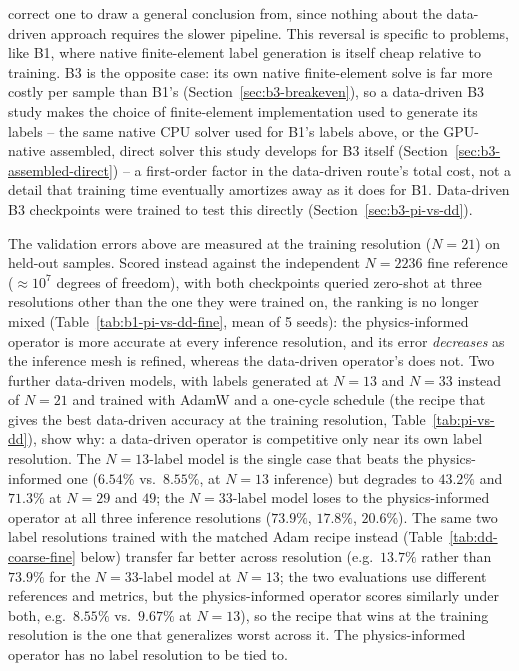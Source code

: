 \documentclass[final,5p,times]{elsarticle}
\begin{document}
correct one to draw a general conclusion from, since nothing about the
data-driven approach requires the slower pipeline. This reversal is specific to problems, like B1, where native
finite-element label generation is itself cheap relative to training.
B3 is the opposite case: its own native finite-element solve is far more
costly per sample than B1's (Section~\ref{sec:b3-breakeven}), so a
data-driven B3 study makes the choice of finite-element
implementation used to generate its labels -- the same native CPU solver
used for B1's labels above, or the GPU-native assembled, direct solver
this study develops for B3 itself (Section~\ref{sec:b3-assembled-direct})
-- a first-order factor in the data-driven route's total cost, not a
detail that training time eventually amortizes away as it does for B1.
Data-driven B3 checkpoints were trained to test this directly
(Section~\ref{sec:b3-pi-vs-dd}).

The validation errors above are measured at the training resolution
($N{=}21$) on held-out samples. Scored instead against the independent
$N{=}2236$ fine reference ($\approx10^7$ degrees of freedom), with both
checkpoints queried zero-shot at three resolutions other than the one
they were trained on, the ranking is no longer mixed
(Table~\ref{tab:b1-pi-vs-dd-fine}, mean of 5 seeds): the physics-informed
operator is more accurate at every inference resolution, and its error
\emph{decreases} as the inference mesh is refined, whereas the
data-driven operator's does not. Two further data-driven models, with
labels generated at $N{=}13$ and $N{=}33$ instead of $N{=}21$ and trained
with AdamW and a one-cycle schedule (the recipe that gives the best
data-driven accuracy at the training resolution,
Table~\ref{tab:pi-vs-dd}), show why: a data-driven operator is
competitive only near its own label resolution. The $N{=}13$-label model is the
single case that beats the physics-informed one ($6.54\%$ vs.\
$8.55\%$, at $N{=}13$ inference) but degrades to $43.2\%$ and $71.3\%$
at $N{=}29$ and $49$; the $N{=}33$-label model loses to the
physics-informed operator at all three inference resolutions ($73.9\%$,
$17.8\%$, $20.6\%$). The same two label resolutions trained with the
matched Adam recipe instead (Table~\ref{tab:dd-coarse-fine} below)
transfer far better across resolution (e.g.\ $13.7\%$ rather than
$73.9\%$ for the $N{=}33$-label model at $N{=}13$; the two evaluations
use different references and metrics, but the physics-informed
operator scores similarly under both, e.g.\ $8.55\%$ vs.\ $9.67\%$ at
$N{=}13$), so the recipe that
wins at the training resolution is the one that generalizes worst
across it. The physics-informed operator has no label resolution to be
tied to.
\end{document}
